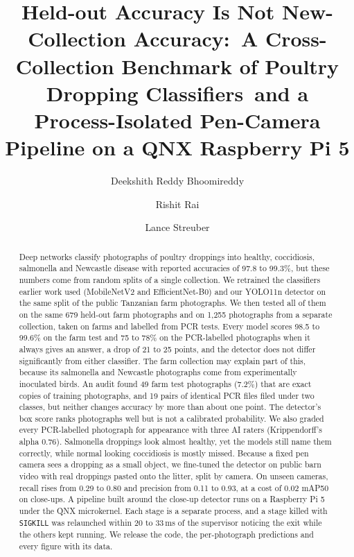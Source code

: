 \documentclass[10pt,twocolumn]{article}
\title{Held-out Accuracy Is Not New-Collection Accuracy:\
A Cross-Collection Benchmark of Poultry Dropping Classifiers\
and a Process-Isolated Pen-Camera Pipeline on a QNX Raspberry Pi 5}
\author{Deekshith Reddy Bhoomireddy \and Rishit Rai \and Lance Streuber}
\date{}
\begin{document}
\maketitle

\begin{abstract}
Deep networks classify photographs of poultry droppings into healthy, coccidiosis, salmonella and Newcastle disease
with reported accuracies of 97.8 to 99.3\%, but these numbers come from random splits of a single collection. We
retrained the classifiers earlier work used (MobileNetV2 and EfficientNet-B0) and our YOLO11n detector on the same
split of the public Tanzanian farm photographs. We then tested all of them on the same 679 held-out farm photographs
and on 1,255 photographs from a separate collection, taken on farms and labelled from PCR tests. Every model scores
98.5 to 99.6\% on the farm test and 75 to 78\% on the PCR-labelled photographs when it always gives an answer, a drop
of 21 to 25 points, and the detector does not differ significantly from either classifier. The farm collection may
explain part of this, because its salmonella and Newcastle photographs come from experimentally inoculated birds. An
audit found 49 farm test photographs (7.2\%) that are exact copies of training photographs, and 19 pairs of identical
PCR files filed under two classes, but neither changes accuracy by more than about one point. The detector's box
score ranks photographs well but is not a calibrated probability. We also graded every PCR-labelled photograph for
appearance with three AI raters (Krippendorff's alpha 0.76). Salmonella droppings look almost healthy, yet the
models still name them correctly, while normal looking coccidiosis is mostly missed. Because a fixed pen camera sees
a dropping as a small object, we fine-tuned the detector on public barn video with real droppings pasted onto the
litter, split by camera. On unseen cameras, recall rises from 0.29 to 0.80 and precision from 0.11 to 0.93, at a cost
of 0.02 mAP50 on close-ups. A pipeline built around the close-up detector runs on a Raspberry Pi 5 under the QNX
microkernel. Each stage is a separate process, and a stage killed with \texttt{SIGKILL} was relaunched within 20 to
33\,ms of the supervisor noticing the exit while the others kept running. We release the code, the per-photograph
predictions and every figure with its data.
\end{abstract}






\end{document}
